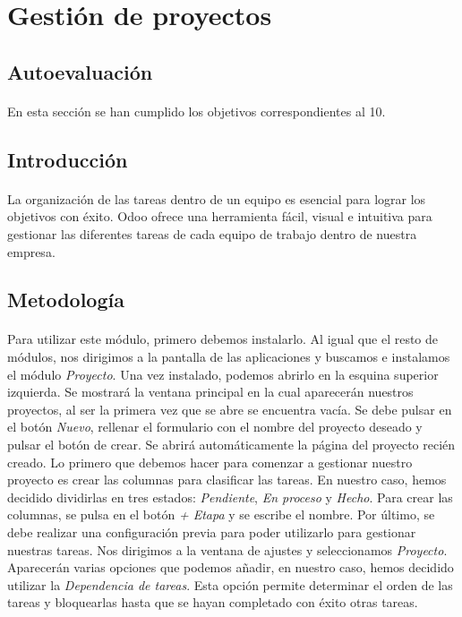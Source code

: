\section{Gestión de proyectos}

\subsection{Autoevaluación}
\paragraph{}
En esta sección se han cumplido los objetivos correspondientes al 10.

\subsection{Introducción}
\paragraph{}
La organización de las tareas dentro de un equipo es esencial para lograr los objetivos con éxito. Odoo ofrece una herramienta fácil, visual e intuitiva para gestionar las diferentes tareas de cada equipo de trabajo dentro de nuestra empresa.

\subsection{Metodología}
\paragraph{}
Para utilizar este módulo, primero debemos instalarlo. Al igual que el resto de módulos, nos dirigimos a la pantalla de las aplicaciones y buscamos e instalamos el módulo \textit{Proyecto}. Una vez instalado, podemos abrirlo en la esquina superior izquierda. Se mostrará la ventana principal en la cual aparecerán nuestros proyectos, al ser la primera vez que se abre se encuentra vacía. Se debe pulsar en el botón \textit{Nuevo}, rellenar el formulario con el nombre del proyecto deseado y pulsar el botón de crear. Se abrirá automáticamente la página del proyecto recién creado. Lo primero que debemos hacer para comenzar a gestionar nuestro proyecto es crear las columnas para clasificar las tareas. En nuestro caso, hemos decidido dividirlas en tres estados: \textit{Pendiente}, \textit{En proceso} y \textit{Hecho}. Para crear las columnas, se pulsa en el botón \textit{+ Etapa} y se escribe el nombre. Por último, se debe realizar una configuración previa para poder utilizarlo para gestionar nuestras tareas. Nos dirigimos a la ventana de ajustes y seleccionamos \textit{Proyecto}. Aparecerán varias opciones que podemos añadir, en nuestro caso, hemos decidido utilizar la \textit{Dependencia de tareas}. Esta opción permite determinar el orden de las tareas y bloquearlas hasta que se hayan completado con éxito otras tareas.
